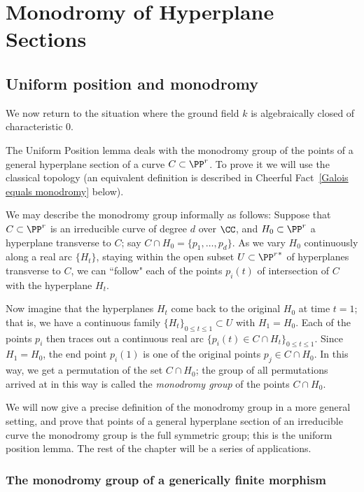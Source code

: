 



\chapter{Monodromy of Hyperplane Sections}\label{uniform position}

\section{Uniform position and monodromy} \label{uniformSection}
We now return to the situation where the ground field $k$ is algebraically closed of characteristic 0.

The Uniform Position lemma deals with the monodromy group of the points of a general hyperplane section of a curve $C \subset \PP^r$. To prove it we will use the classical topology (an equivalent definition is described in Cheerful Fact~\ref{Galois equals monodromy} below). 

We may describe the monodromy group informally as follows: Suppose that $C \subset \PP^r$ is an irreducible curve of degree $d$ over $\CC$, and $H_0 \subset \PP^r$ a hyperplane transverse to $C$; say $C \cap H_0 = \{p_1,\dots,p_d\}$. As we vary $H_0$ continuously along a real arc $\{H_t\}$, staying within the open subset $U \subset {\PP^r}^*$ of hyperplanes transverse to $C$, we can ``follow" each of the points $p_i(t)$ of intersection of $C$ with the hyperplane $H_t$.

Now imagine that the hyperplanes $H_t$ come back to the original $H_0$ at time $t=1$; that is, we have a continuous family $\{H_t\}_{0 \leq t \leq 1} \subset U$ with $H_1 = H_0$. Each of the points $p_i$ then traces out a continuous real arc 
$\{p_i(t) \in C \cap H_t\}_{0 \leq t \leq 1}$. Since $H_1 = H_0$, the end point $p_i(1)$ is one of the original points $p_j \in C \cap H_0$. In this way, we get a permutation of the set $C \cap H_0$; the group of all permutations arrived at in this way is called the \emph{monodromy group} of the points $C \cap H_0$. 

We will now give a precise definition of the monodromy group in a more general setting, and prove that points of a general hyperplane section of an irreducible curve
the monodromy group is the full symmetric group; this is the uniform position lemma. The rest of the chapter will be a series of applications.

\subsection{The monodromy group of a generically finite morphism}

